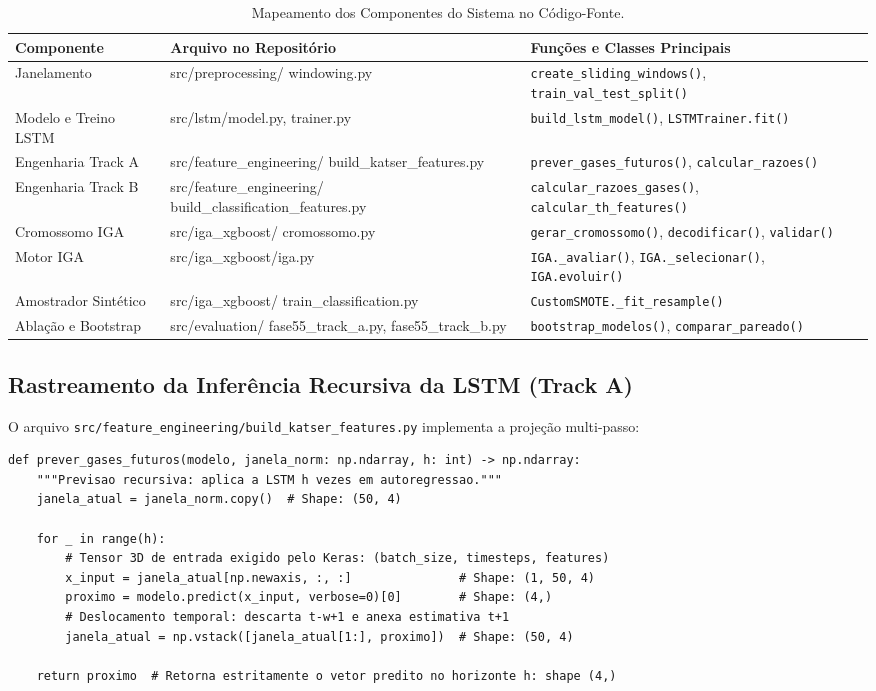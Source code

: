 \documentclass[11pt,a4paper]{article}
\begin{document}
\begin{table}[htbp]
  \centering\small
  \caption{Mapeamento dos Componentes do Sistema no Código-Fonte.}
  \label{tab:mapa_arquivos}
  \begin{tabularx}{\textwidth}{l >{\raggedright\arraybackslash\ttfamily\footnotesize}p{5.5cm} >{\raggedright\arraybackslash}X}
    \toprule
    \textbf{Componente} & \textbf{Arquivo no Repositório} & \textbf{Funções e Classes Principais} \\
    \midrule
    Janelamento & src/preprocessing/ windowing.py & \texttt{create\_sliding\_windows()}, \texttt{train\_val\_test\_split()} \\
    Modelo e Treino LSTM & src/lstm/model.py, trainer.py & \texttt{build\_lstm\_model()}, \texttt{LSTMTrainer.fit()} \\
    Engenharia Track A & src/feature\_engineering/ build\_katser\_features.py & \texttt{prever\_gases\_futuros()}, \texttt{calcular\_razoes()} \\
    Engenharia Track B & src/feature\_engineering/ build\_classification\_features.py & \texttt{calcular\_razoes\_gases()}, \texttt{calcular\_th\_features()} \\
    Cromossomo IGA & src/iga\_xgboost/ cromossomo.py & \texttt{gerar\_cromossomo()}, \texttt{decodificar()}, \texttt{validar()} \\
    Motor IGA & src/iga\_xgboost/iga.py & \texttt{IGA.\_avaliar()}, \texttt{IGA.\_selecionar()}, \texttt{IGA.evoluir()} \\
    Amostrador Sintético & src/iga\_xgboost/ train\_classification.py & \texttt{CustomSMOTE.\_fit\_resample()} \\
    Ablação e Bootstrap & src/evaluation/ fase55\_track\_a.py, fase55\_track\_b.py & \texttt{bootstrap\_modelos()}, \texttt{comparar\_pareado()} \\
    \bottomrule
  \end{tabularx}
\end{table}

\subsection{Rastreamento da Inferência Recursiva da LSTM (Track A)}
O arquivo \texttt{src/feature\_engineering/build\_katser\_features.py} implementa a projeção multi-passo:

\begin{lstlisting}
def prever_gases_futuros(modelo, janela_norm: np.ndarray, h: int) -> np.ndarray:
    """Previsao recursiva: aplica a LSTM h vezes em autoregressao."""
    janela_atual = janela_norm.copy()  # Shape: (50, 4)

    for _ in range(h):
        # Tensor 3D de entrada exigido pelo Keras: (batch_size, timesteps, features)
        x_input = janela_atual[np.newaxis, :, :]               # Shape: (1, 50, 4)
        proximo = modelo.predict(x_input, verbose=0)[0]        # Shape: (4,)
        # Deslocamento temporal: descarta t-w+1 e anexa estimativa t+1
        janela_atual = np.vstack([janela_atual[1:], proximo])  # Shape: (50, 4)

    return proximo  # Retorna estritamente o vetor predito no horizonte h: shape (4,)
\end{lstlisting}
\end{document}
